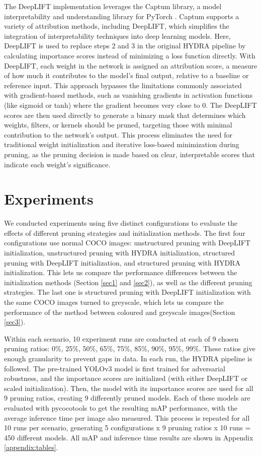 \documentclass[journal,onecolumn,12pt]{IEEEtran}
\begin{document}
The DeepLIFT implementation leverages the Captum library, a model interpretability and understanding library for PyTorch \cite{captum}. Captum supports a variety of attribution methods, including DeepLIFT, which simplifies the integration of interpretability techniques into deep learning models. Here, DeepLIFT is used to replace steps 2 and 3 in the original HYDRA pipeline by calculating importance scores instead of minimizing a loss function directly. With DeepLIFT, each weight in the network is assigned an attribution score, a measure of how much it contributes to the model’s final output, relative to a baseline or reference input. This approach bypasses the limitations commonly associated with gradient-based methods, such as vanishing gradients in activation functions (like sigmoid or tanh) where the gradient becomes very close to 0. The DeepLIFT scores are then used directly to generate a binary mask that determines which weights, filters, or kernels should be pruned, targeting those with minimal contribution to the network's output. This process eliminates the need for traditional weight initialization and iterative loss-based minimization during pruning, as the pruning decision is made based on clear, interpretable scores that indicate each weight’s significance.

\section{Experiments}

We conducted experiments using five distinct configurations to evaluate the effects of different pruning strategies and initialization methods. The first four configurations use normal COCO images: unstructured pruning with DeepLIFT initialization, unstructured pruning with HYDRA initialization, structured pruning with DeepLIFT initialization, and structured pruning with HYDRA initialization. This lets us compare the performance differences between the initialization methods (Section \ref{sec1} and \ref{sec2}), as well as the different pruning strategies. The last one is structured pruning with DeepLIFT initialization with the same COCO images turned to greyscale, which lets us compare the performance of the method between coloured and greyscale images(Section \ref{sec3}).

Within each scenario, 10 experiment runs are conducted at each of 9 chosen pruning ratios: 0\%, 25\%, 50\%, 65\%, 75\%, 85\%, 90\%, 95\%, 99\%. These ratios give enough granularity to prevent gaps in data. In each run, the HYDRA pipeline is followed. The pre-trained YOLOv3 model is first trained for adversarial robustness, and the importance scores are initialized (with either DeepLIFT or scaled initialization). Then, the model with its importance scores are used for all 9 pruning ratios, creating 9 differently pruned models. Each of these models are evaluated with pycocotools to get the resulting mAP performance, with the average inference time per image also measured. This process is repeated for all 10 runs per scenario, generating 5 configurations x 9 pruning ratios x 10 runs = 450 different models. All mAP and inference time results are shown in Appendix \ref{appendix:tables}.
\end{document}
